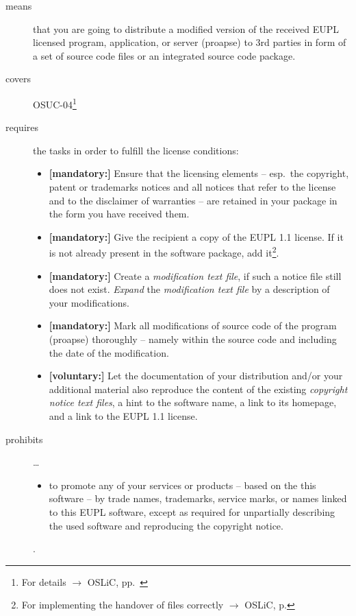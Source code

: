 \begin{description}
\item[means] that you are going to distribute a modified version of the received
EUPL licensed program, application, or server (proapse) to 3rd parties in form
of a set of source code files or an integrated source code package.
\item[covers] OSUC-04\footnote{For details $\rightarrow$ OSLiC, pp.\ \pageref{OSUC-04-DEF}}
\item[requires] the tasks in order to fulfill the license conditions:
\begin{itemize}
  
  \item \textbf{[mandatory:]} Ensure that the licensing elements -- esp.\ the
  copyright, patent or trademarks notices and all notices that refer to the
  license and to the disclaimer of warranties -- are retained in your package in
  the form you have received them.
  
  \item \textbf{[mandatory:]} Give the recipient a copy of the EUPL 1.1
  license. If it is not already present in the software package, add
  it\footnote{For implementing the handover of files correctly $\rightarrow$
  OSLiC, p. \pageref{DistributingFilesHint}}.

  \item \textbf{[mandatory:]} Create a \emph{modification text file}, if such a
  notice file still does not exist. \emph{Expand} the \emph{modification text
  file} by a description of your modifications.
    
  \item \textbf{[mandatory:]} Mark all modifications of source code of the
  program (proapse) thoroughly -- namely within the
  source code and including the date of the modification.
   
  \item \textbf{[voluntary:]} Let the documentation of your distribution and/or
  your additional material also reproduce the content of the existing
  \emph{copyright notice text files}, a hint to the software name, a link to its
  homepage, and a link to the EUPL 1.1 license.
  
 \end{itemize}
 
\item[prohibits] \ldots
\begin{itemize}
  \item to promote any of your services or products – based on the this software
  – by trade names, trademarks, service marks, or names linked to this EUPL
  software, except as required for unpartially describing the used software and
  reproducing the copyright notice.
\end{itemize}.

\end{description}

